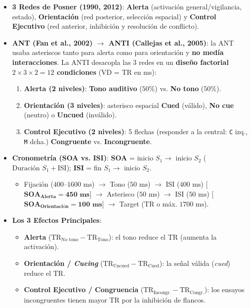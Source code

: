 \documentclass[11pt,a4paper]{article}
\begin{document}
\begin{itemize}
  \item \textbf{3 Redes de Posner (1990, 2012)}: \textbf{Alerta} (activación general/vigilancia, estado), \textbf{Orientación} (red posterior, selección espacial) y \textbf{Control Ejecutivo} (red anterior, inhibición y resolución de conflicto).
  \item \textbf{ANT (Fan et al., 2002) $\to$ ANTI (Callejas et al., 2005)}: la ANT usaba asteriscos tanto para alerta como para orientación y \textbf{no medía interacciones}. La ANTI desacopla las 3 redes en un \textbf{diseño factorial $2 \times 3 \times 2 = 12$ condiciones} (VD = TR en ms):
  \begin{enumerate}
    \item \textbf{Alerta (2 niveles)}: \textbf{Tono auditivo} ($50\%$) vs. \textbf{No tono} ($50\%$).
    \item \textbf{Orientación (3 niveles)}: asterisco espacial \textbf{Cued} (válido), \textbf{No cue} (neutro) o \textbf{Uncued} (inválido).
    \item \textbf{Control Ejecutivo (2 niveles)}: 5 flechas (responder a la central: \texttt{C} izq., \texttt{M} dcha.) \textbf{Congruente} vs. \textbf{Incongruente}.
  \end{enumerate}
  \item \textbf{Cronometría (SOA vs. ISI)}: \textbf{SOA} = inicio $S_1 \to$ inicio $S_2$ ($\text{Duración } S_1 + \text{ISI}$); \textbf{ISI} = fin $S_1 \to$ inicio $S_2$.
  \begin{itemize}
    \item Fijación ($400\text{--}1600\text{ ms}$) $\to$ Tono ($50\text{ ms}$) $\to$ ISI ($400\text{ ms}$) [$\mathbf{\text{SOA}_{\text{Alerta}} = 450\text{ ms}}$] $\to$ Asterisco ($50\text{ ms}$) $\to$ ISI ($50\text{ ms}$) [$\mathbf{\text{SOA}_{\text{Orientación}} = 100\text{ ms}}$] $\to$ Target ($\text{TR}$ o máx. $1700\text{ ms}$).
  \end{itemize}
  \item \textbf{Los 3 Efectos Principales}:
  \begin{itemize}
    \item \textbf{Alerta} ($\text{TR}_{\text{No tono}} - \text{TR}_{\text{Tono}}$): el tono reduce el TR (aumenta la activación).
    \item \textbf{Orientación / \textit{Cueing}} ($\text{TR}_{\text{Uncued}} - \text{TR}_{\text{Cued}}$): la señal válida (\textit{cued}) reduce el TR.
    \item \textbf{Control Ejecutivo / Congruencia} ($\text{TR}_{\text{Incongr.}} - \text{TR}_{\text{Congr.}}$): los ensayos incongruentes tienen mayor TR por la inhibición de flancos.
  \end{itemize}
\end{itemize}
\end{document}
